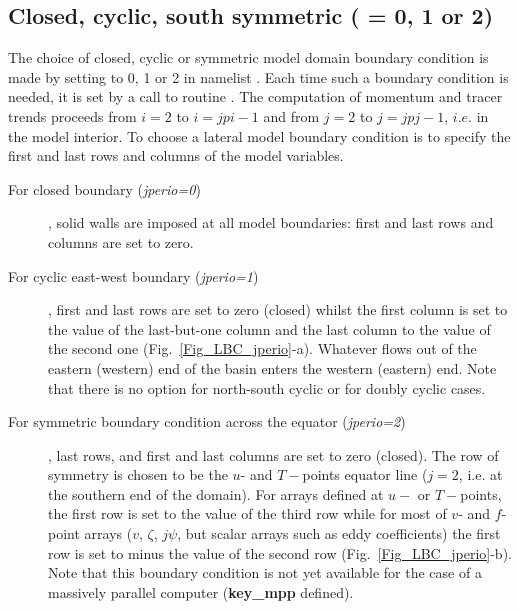 \subsection{Closed, cyclic, south symmetric ( = 0, 1 or 2)}
\label{LBC_jperio012}

The choice of closed, cyclic or symmetric model domain boundary condition is made 
by setting  to 0, 1 or 2 in namelist . Each time such a boundary 
condition is needed, it is set by a call to routine . The computation of 
momentum and tracer trends proceeds from $i=2$ to $i=jpi-1$ and from $j=2$ to 
$j=jpj-1$, $i.e.$ in the model interior. To choose a lateral model boundary condition 
is to specify the first and last rows and columns of the model variables. 

\begin{description}

\item[For closed boundary (\textit{jperio=0})], solid walls are imposed at all model 
boundaries: first and last rows and columns are set to zero.

\item[For cyclic east-west boundary (\textit{jperio=1})], first and last rows are set 
to zero (closed) whilst the first column is set to the value of the last-but-one column 
and the last column to the value of the second one (Fig.~\ref{Fig_LBC_jperio}-a). 
Whatever flows out of the eastern (western) end of the basin enters the western 
(eastern) end. Note that there is no option for north-south cyclic or for doubly 
cyclic cases.

\item[For symmetric boundary condition across the equator (\textit{jperio=2})], 
last rows, and first and last columns are set to zero (closed). The row of symmetry 
is chosen to be the $u$- and $T-$points equator line ($j=2$, i.e. at the southern 
end of the domain). For arrays defined at $u-$ or $T-$points, the first row is set 
to the value of the third row while for most of $v$- and $f$-point arrays ($v$, $\zeta$, 
$j\psi$, but  scalar arrays such as eddy coefficients) 
the first row is set to minus the value of the second row (Fig.~\ref{Fig_LBC_jperio}-b). 
Note that this boundary condition is not yet available for the case of a massively 
parallel computer (\textbf{key{\_}mpp} defined).

\end{description}

